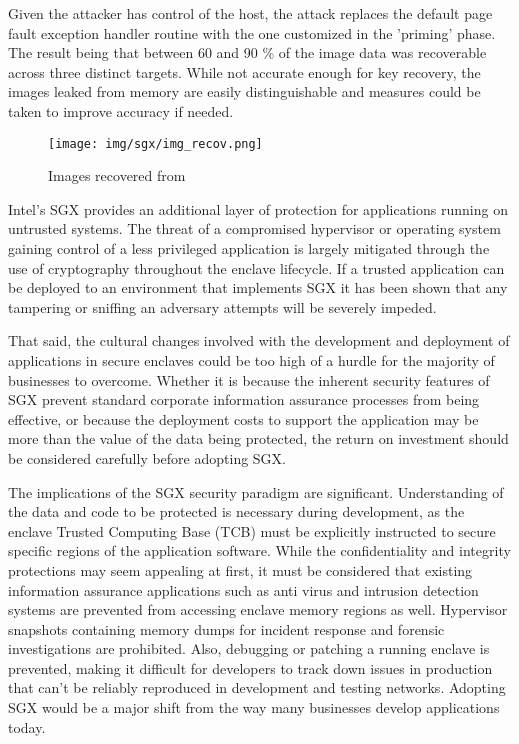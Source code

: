 Given the attacker has control of the host, the attack replaces the default page fault exception handler routine with the one customized in the 'priming' phase. The result being that between 60 and 90 \% of the image data was recoverable across three distinct targets. While not accurate enough for key recovery, the images leaked from memory are easily distinguishable and measures could be taken to improve accuracy if needed. 

\begin{figure}[H]
\centering
\texttt{[image: img/sgx/img\_recov.png]}
\caption{Images recovered from \cite{SGXinpractice}}
\end{figure}




Intel's SGX provides an additional layer of protection for applications running on untrusted systems. The threat of a compromised hypervisor or operating system gaining control of a less privileged application is largely mitigated through the use of cryptography throughout the enclave lifecycle. If a trusted application can be deployed to an environment that implements SGX it has been shown that any tampering or sniffing an adversary attempts will be severely impeded. 

That said, the cultural changes involved with the development and deployment of applications in secure enclaves could be too high of a hurdle for the majority of businesses to overcome. Whether it is because the inherent security features of SGX prevent standard corporate information assurance processes from being effective, or because the deployment costs to support the application may be more than the value of the data being protected, the return on investment should be considered carefully before adopting SGX. 

The implications of the SGX security paradigm are significant. Understanding of the data and code to be protected is necessary during development, as the enclave Trusted Computing Base (TCB) must be explicitly instructed to secure specific regions of the application software. While the confidentiality and integrity protections may seem appealing at first, it must be considered that existing information assurance applications such as anti virus and intrusion detection systems are prevented from accessing enclave memory regions as well. Hypervisor snapshots containing memory dumps for incident response and forensic investigations are prohibited. Also, debugging or patching a running enclave is prevented, making it difficult for developers to track down issues in production that can't be reliably reproduced in development and testing networks. Adopting SGX would be a major shift from the way many businesses develop applications today.

